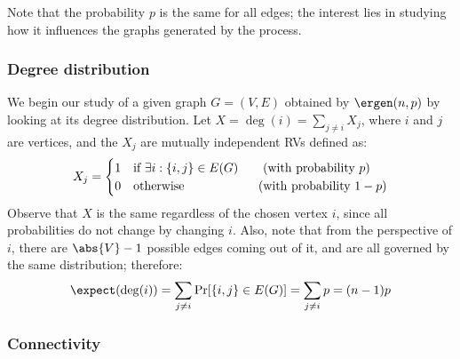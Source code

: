 Note that the probability $p$ is the same for all edges; the interest lies in studying how it influences the graphs generated by the process.
    

\subsubsection{Degree distribution}\label{sec:gnp-degree}

We begin our study of a given graph $G = (V, E)$ obtained by $\ergen(n, p)$ by looking at its degree distribution. Let $X = \deg(i) = \sum_{j \neq i} X_j$, where $i$ and $j$ are vertices, and the $X_j$ are mutually independent RVs defined as:
\[
    X_j =
    \begin{cases}
        1 & \text{if } \exists i : \{i, j\} \in E(G) \text{\qquad (with probability } p)                    \\
        0 & \text{otherwise}                         \text{\qquad \qquad \qquad (with probability } 1 - p)  \\
    \end{cases}
\]
Observe that $X$ is the same regardless of the chosen vertex $i$, since all probabilities do not change by changing $i$. Also, note that from the perspective of $i$, there are $\abs{V} - 1$ possible edges coming out of it, and are all governed by the same distribution; therefore:
\[
    \expect(\deg(i)) = \sum_{j \neq i} \Pr[\{i, j\} \in E(G)] = \sum_{j \neq i} p = (n - 1) p
\]



\subsubsection{Connectivity}

